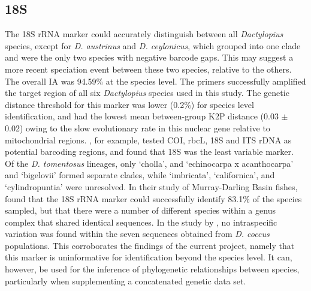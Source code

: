 \subsection{18S}
The 18S rRNA marker could accurately distinguish between all \textit{Dactylopius} species, except for \textit{D. austrinus} and \textit{D. ceylonicus}, which grouped into one clade and were the only two species with negative barcode gaps. This may suggest a more recent speciation event between these two species, relative to the others. The overall IA was 94.59\% at the species level. The primers successfully amplified the target region of all six \textit{Dactylopius} species used in this study. The genetic distance threshold for this marker was lower (0.2\%) for species level identification, and had the lowest mean between-group K2P distance (0.03 $\pm$ 0.02) owing to the slow evolutionary rate in this nuclear gene relative to mitochondrial regions. \citet{evans2007assessment}, for example, tested COI, rbcL, 18S and ITS rDNA as potential barcoding regions, and found that 18S was the least variable marker. \\
Of the \textit{D. tomentosus} lineages, only `cholla', and `echinocarpa x acanthocarpa' and `bigelovii' formed separate clades, while `imbricata', `californica', and `cylindropuntia' were unresolved. In their study of Murray-Darling Basin fishes, \citet{hardy2011dna} found that the 18S rRNA marker could successfully identify 83.1\% of the species sampled, but that there were a number of different species within a genus complex that shared identical sequences. In the study by \citet{Campana2015}, no intraspecific variation was found within the seven sequences obtained from \textit{D. coccus} populations. This corroborates the findings of the current project, namely that this marker is uninformative for identification beyond the species level. It can, however, be used for the inference of phylogenetic relationships between species, particularly when supplementing a concatenated genetic data set.

